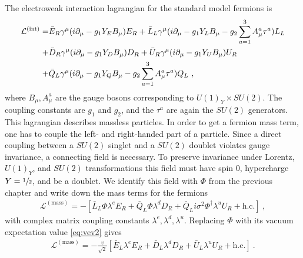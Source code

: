 The electroweak interaction lagrangian for the standard model fermions is
\begin{align}\label{eq:LFermion}
	\mathcal{L}^{(\text{int})} = &\bar{E}_R\gamma^\mu(i\partial_\mu-g_1Y_EB_\mu)E_R + \bar{L}_L\gamma^\mu(i\partial_\mu-g_1Y_LB_\mu-g_2\sum_{a=1}^{3}A_\mu^a\tau^a)L_L \notag \\
	+ &\bar{D}_R\gamma^\mu(i\partial_\mu-g_1Y_DB_\mu)D_R + \bar{U}_R\gamma^\mu(i\partial_\mu-g_1Y_UB_\mu)U_R \notag \\
	+ &\bar{Q}_L\gamma^\mu(i\partial_\mu-g_1Y_QB_\mu-g_2\sum_{a=1}^{3}A_\mu^a\tau^a)Q_L \ ,
\end{align}
where $B_\mu, A_\mu^a$ are the gauge bosons corresponding to $U(1)_Y\times SU(2)$. The coupling constants are $g_1$ and $g_2$, and the $\tau^a$ are again the $SU(2)$ generators. This lagrangian describes massless particles. In order to get a fermion mass term, one has to couple the left- and right-handed part of a particle. Since a direct coupling between a $SU(2)$ singlet and a $SU(2)$ doublet violates gauge invariance, a connecting field is necessary. To preserve invariance under Lorentz, $U(1)_Y$, and $SU(2)$ transformations this field must have spin 0, hypercharge $Y=\sfrac{1}{2}$, and be a doublet. We identify this field with $\Phi$ from the previous chapter and write down the mass terms for the fermions
\begin{align}
	\mathcal{L}^{(\text{mass})} = -\left[\bar{L}_L\Phi\lambda^e  E_R  + \bar{Q}_L\Phi\lambda^d D_R + \bar{Q}_Li\sigma^2\Phi^\dagger\lambda^u U_R + \text{h.c.}\right] \ ,
\end{align}
with complex matrix coupling constants $\lambda^e,\lambda^d,\lambda^u$. Replacing $\Phi$ with its vacuum expectation value \eqref{eq:vev2} gives
\begin{align}\label{eq:LMass}
	\mathcal{L}^{(\text{mass})} = -\frac{v}{\sqrt{2}}\left[ \bar{E}_L\lambda^e E_R  + \bar{D}_L \lambda^dD_R + \bar{U}_L\lambda^u U_R + \text{h.c.}\right] \ .
\end{align}



